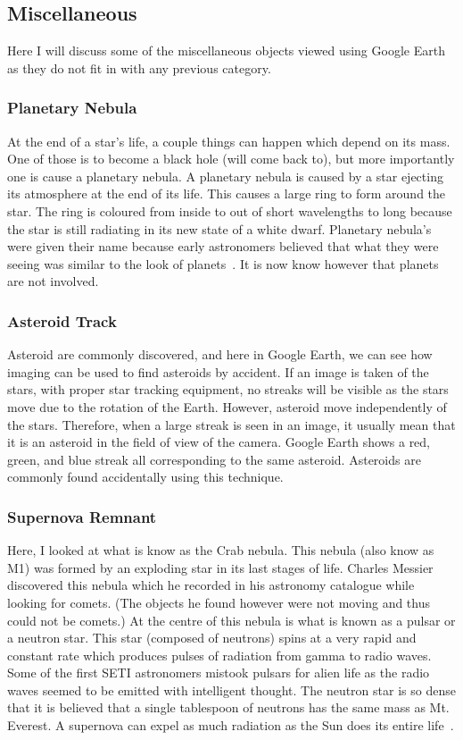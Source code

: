 \documentclass{article}
\begin{document}
\subsection{Miscellaneous}
Here I will discuss some of the miscellaneous objects viewed using Google Earth as they
do not fit in with any previous category.

\subsubsection{Planetary Nebula}
At the end of a star's life, a couple things can happen which depend on its mass. One of those
is to become a black hole (will come back to), but more importantly one is cause a planetary
nebula. A planetary nebula is caused by a star ejecting its atmosphere at the end of its life.
This causes a large ring to form around the star. The ring is coloured from inside to out 
of short wavelengths to long because the star is still radiating in its new state of a white
dwarf. Planetary nebula's were given their name because early astronomers believed that what
they were seeing was similar to the look of planets~\cite{Plan:1997}. 
It is now know however that planets are not involved.

\subsubsection{Asteroid Track}
Asteroid are commonly discovered, and here in Google Earth, we can see how imaging can be
used to find asteroids by accident. If an image is taken of the stars, with proper star
tracking equipment, no streaks will be visible as the stars move due to the rotation of
the Earth. However, asteroid move independently of the stars. Therefore, when a large streak 
is seen in an image, it usually mean that it is an asteroid in the field of view of the
camera. Google Earth shows a red, green, and blue streak all corresponding to the same
asteroid. Asteroids are commonly found accidentally using this technique.

\subsubsection{Supernova Remnant}
Here, I looked at what is know as the Crab nebula. This nebula (also know as M1) was formed
by an exploding star in its last stages of life. Charles Messier discovered this nebula which
he recorded in his astronomy catalogue while looking for comets. (The objects he found however
were not moving and thus could not be comets.) At the centre of this nebula is what is known
as a pulsar or a neutron star. This star (composed of neutrons) spins at a very rapid and
constant rate which produces pulses of radiation from gamma to radio waves. Some of the first
SETI astronomers mistook pulsars for alien life as the radio waves seemed to be emitted with
intelligent thought. The neutron star is so dense that it is believed that a single tablespoon
of neutrons has the same mass as Mt. Everest. A supernova can expel as much radiation as the
Sun does its entire life~\cite{Sun:2007}.
\end{document}
